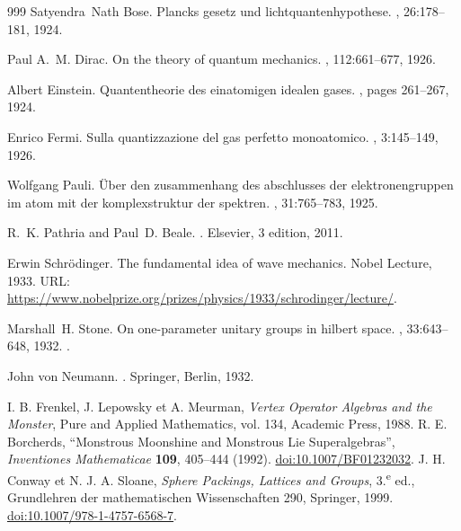 \begin{thebibliography}{999}
Satyendra~Nath Bose.
\newblock Plancks gesetz und lichtquantenhypothese.
, 26:178--181, 1924.

Paul A.~M. Dirac.
\newblock On the theory of quantum mechanics.
, 112:661--677, 1926.

Albert Einstein.
\newblock Quantentheorie des einatomigen idealen gases.
,
  pages 261--267, 1924.

Enrico Fermi.
\newblock Sulla quantizzazione del gas perfetto monoatomico.
, 3:145--149, 1926.

Wolfgang Pauli.
\newblock Über den zusammenhang des abschlusses der elektronengruppen im atom
  mit der komplexstruktur der spektren.
, 31:765--783, 1925.

R.~K. Pathria and Paul~D. Beale.
.
\newblock Elsevier, 3 edition, 2011.

Erwin Schrödinger.
\newblock The fundamental idea of wave mechanics.
\newblock Nobel Lecture, 1933.
\newblock URL:
  \url{https://www.nobelprize.org/prizes/physics/1933/schrodinger/lecture/}.

Marshall~H. Stone.
\newblock On one-parameter unitary groups in hilbert space.
, 33:643--648, 1932.
\newblock \href {https://doi.org/10.2307/1968538} {}.

John von Neumann.
.
\newblock Springer, Berlin, 1932.

 I. B. Frenkel, J. Lepowsky et A. Meurman, \emph{Vertex Operator Algebras and the Monster}, Pure and Applied Mathematics, vol. 134, Academic Press, 1988.
 R. E. Borcherds, ``Monstrous Moonshine and Monstrous Lie Superalgebras'', \emph{Inventiones Mathematicae} \textbf{109}, 405--444 (1992). \href{https://doi.org/10.1007/BF01232032}{doi:10.1007/BF01232032}.
 J. H. Conway et N. J. A. Sloane, \emph{Sphere Packings, Lattices and Groups}, 3.\textsuperscript{e} ed., Grundlehren der mathematischen Wissenschaften 290, Springer, 1999. \href{https://doi.org/10.1007/978-1-4757-6568-7}{doi:10.1007/978-1-4757-6568-7}.



\end{thebibliography}
